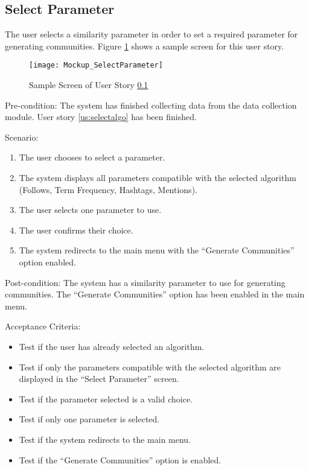 \subsection{Select Parameter}
\label{us:selectparam}


The user selects a similarity parameter in order to set a required parameter for generating communities. Figure \ref{fig:selectparam} shows a sample screen for this user story.

\begin{figure}[h]
	\centering
	\texttt{[image: Mockup\_SelectParameter]}
	\caption{Sample Screen of User Story \ref{us:selectparam}}
	\label{fig:selectparam}	
\end{figure}


Pre-condition: The system has finished collecting data from the data collection module. User story \ref{us:selectalgo} has been finished.


Scenario:
\begin{enumerate}
	\item The user chooses to select a parameter.
	\item The system displays all parameters compatible with the selected algorithm (Follows, Term Frequency, Hashtags, Mentions).
	\item The user selects one parameter to use.
	\item The user confirms their choice.
	\item The system redirects to the main menu with the ``Generate Communities'' option enabled.
\end{enumerate}


Post-condition: The system has a similarity parameter to use for generating communities. The ``Generate Communities'' option
has been enabled in the main menu.


Acceptance Criteria:
\begin{itemize}
	\item Test if the user has already selected an algorithm.
	\item Test if only the parameters compatible with the selected algorithm are displayed in the ``Select Parameter'' screen.
	\item Test if the parameter selected is a valid choice.
	\item Test if only one parameter is selected.
	\item Test if the system redirects to the main menu.
	\item Test if the ``Generate Communities'' option is enabled.
\end{itemize}


